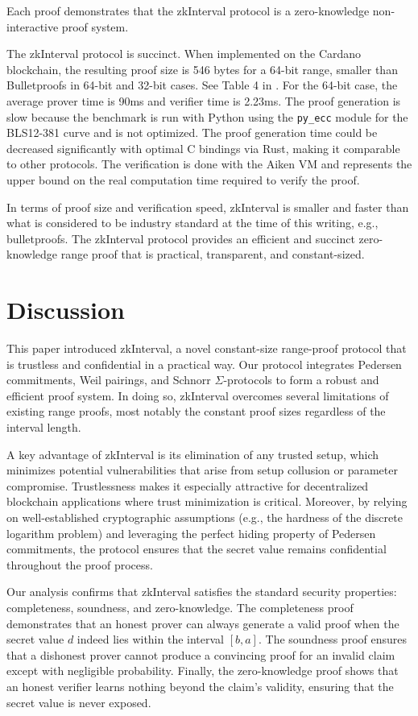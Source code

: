 \documentclass{iacrcc}
\theoremstyle{definition}
\begin{document}
Each proof demonstrates that the zkInterval protocol is a zero-knowledge non-interactive proof system.

The zkInterval protocol is succinct. When implemented on the Cardano blockchain, the resulting proof size is 546 bytes for a 64-bit range, smaller than Bulletproofs in 64-bit and 32-bit cases. See Table 4 in \cite{christetal2024}. For the 64-bit case, the average prover time is 90ms and verifier time is 2.23ms. The proof generation is slow because the benchmark is run with Python using the \texttt{py\_ecc} module for the BLS12-381 curve and is not optimized. The proof generation time could be decreased significantly with optimal C bindings via Rust, making it comparable to other protocols. The verification is done with the Aiken VM and represents the upper bound on the real computation time required to verify the proof.

In terms of proof size and verification speed, zkInterval is smaller and faster than what is considered to be industry standard at the time of this writing, e.g., bulletproofs. The zkInterval protocol provides an efficient and succinct zero-knowledge range proof that is practical, transparent, and constant-sized.

\section{Discussion}

This paper introduced zkInterval, a novel constant-size range-proof protocol that is trustless and confidential in a practical way. Our protocol integrates Pedersen commitments, Weil pairings, and Schnorr \(\Sigma\)-protocols to form a robust and efficient proof system. In doing so, zkInterval overcomes several limitations of existing range proofs, most notably the constant proof sizes regardless of the interval length.

A key advantage of zkInterval is its elimination of any trusted setup, which minimizes potential vulnerabilities that arise from setup collusion or parameter compromise. Trustlessness makes it especially attractive for decentralized blockchain applications where trust minimization is critical. Moreover, by relying on well-established cryptographic assumptions (e.g., the hardness of the discrete logarithm problem) and leveraging the perfect hiding property of Pedersen commitments, the protocol ensures that the secret value remains confidential throughout the proof process.

Our analysis confirms that zkInterval satisfies the standard security properties: completeness, soundness, and zero-knowledge. The completeness proof demonstrates that an honest prover can always generate a valid proof when the secret value \(d\) indeed lies within the interval \([b, a]\). The soundness proof ensures that a dishonest prover cannot produce a convincing proof for an invalid claim except with negligible probability. Finally, the zero-knowledge proof shows that an honest verifier learns nothing beyond the claim's validity, ensuring that the secret value is never exposed.
\end{document}
